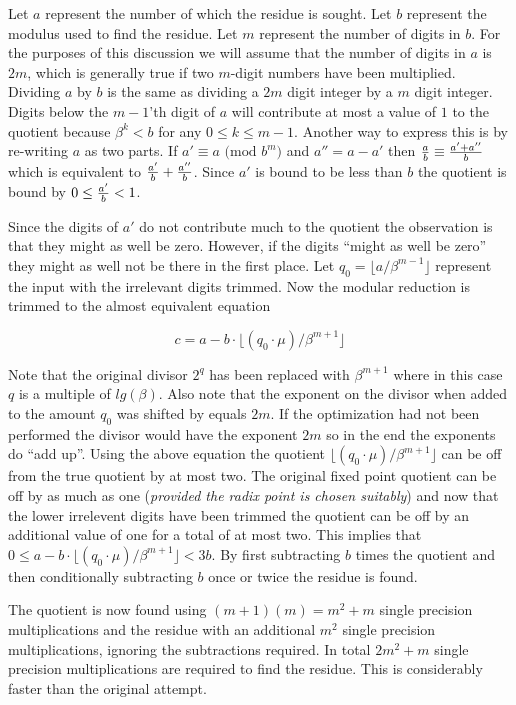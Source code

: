 \documentclass[b5paper]{book}
\begin{document}
Let $a$ represent the number of which the residue is sought.  Let $b$ represent the modulus used to find the residue.  Let $m$ represent
the number of digits in $b$.  For the purposes of this discussion we will assume that the number of digits in $a$ is $2m$, which is generally true if 
two $m$-digit numbers have been multiplied.  Dividing $a$ by $b$ is the same as dividing a $2m$ digit integer by a $m$ digit integer.  Digits below the 
$m - 1$'th digit of $a$ will contribute at most a value of $1$ to the quotient because $\beta^k < b$ for any $0 \le k \le m - 1$.  Another way to
express this is by re-writing $a$ as two parts.  If $a' \equiv a \mbox{ (mod }b^m\mbox{)}$ and $a'' = a - a'$ then 
${a \over b} \equiv {{a' + a''} \over b}$ which is equivalent to ${a' \over b} + {a'' \over b}$.  Since $a'$ is bound to be less than $b$ the quotient
is bound by $0 \le {a' \over b} < 1$.

Since the digits of $a'$ do not contribute much to the quotient the observation is that they might as well be zero.  However, if the digits 
``might as well be zero'' they might as well not be there in the first place.  Let $q_0 = \lfloor a/\beta^{m-1} \rfloor$ represent the input
with the irrelevant digits trimmed.  Now the modular reduction is trimmed to the almost equivalent equation

\begin{equation}
c = a - b \cdot \lfloor (q_0 \cdot \mu) / \beta^{m+1} \rfloor
\end{equation}

Note that the original divisor $2^q$ has been replaced with $\beta^{m+1}$ where in this case $q$ is a multiple of $lg(\beta)$. Also note that the 
exponent on the divisor when added to the amount $q_0$ was shifted by equals $2m$.  If the optimization had not been performed the divisor 
would have the exponent $2m$ so in the end the exponents do ``add up''. Using the above equation the quotient 
$\lfloor (q_0 \cdot \mu) / \beta^{m+1} \rfloor$ can be off from the true quotient by at most two.  The original fixed point quotient can be off
by as much as one (\textit{provided the radix point is chosen suitably}) and now that the lower irrelevent digits have been trimmed the quotient
can be off by an additional value of one for a total of at most two.  This implies that 
$0 \le a - b \cdot \lfloor (q_0 \cdot \mu) / \beta^{m+1} \rfloor < 3b$.  By first subtracting $b$ times the quotient and then conditionally subtracting 
$b$ once or twice the residue is found.

The quotient is now found using $(m + 1)(m) = m^2 + m$ single precision multiplications and the residue with an additional $m^2$ single
precision multiplications, ignoring the subtractions required.  In total $2m^2 + m$ single precision multiplications are required to find the residue.  
This is considerably faster than the original attempt.
\end{document}
